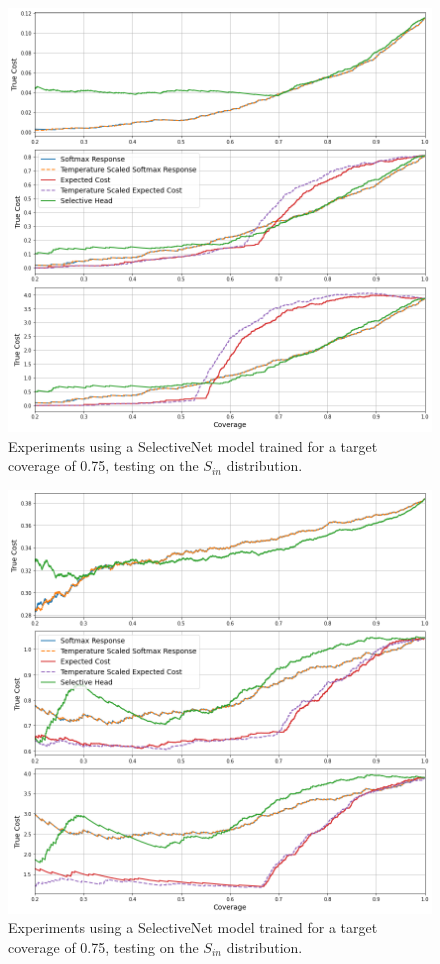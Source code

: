 \begin{figure}[H]
	\includegraphics[width=\textwidth]{images/binary/sn0.75_in_distribution.png}
	\caption*{Experiments using a SelectiveNet model trained for a target coverage of 0.75, testing on the $S_{in}$ distribution.}
\end{figure}

\begin{figure}[H]
	\includegraphics[width=\textwidth]{images/binary/sn0.75_out_distribution.png}
	\caption*{Experiments using a SelectiveNet model trained for a target coverage of 0.75, testing on the $S_{in}$ distribution.}
\end{figure}

